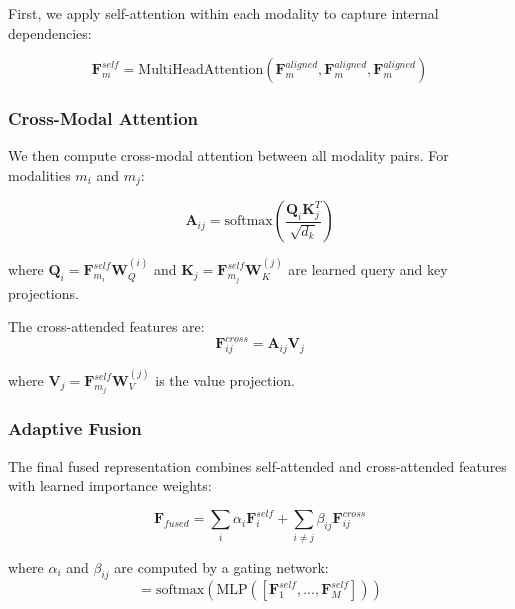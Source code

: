 \documentclass[10pt,twocolumn]{article}
\begin{document}
First, we apply self-attention within each modality to capture internal dependencies:

\begin{equation}
\mathbf{F}_m^{self} = \text{MultiHeadAttention}(\mathbf{F}_m^{aligned}, \mathbf{F}_m^{aligned}, \mathbf{F}_m^{aligned})
\end{equation}

\subsubsection{Cross-Modal Attention}

We then compute cross-modal attention between all modality pairs. For modalities $m_i$ and $m_j$:

\begin{equation}
\mathbf{A}_{ij} = \text{softmax}\left(\frac{\mathbf{Q}_i \mathbf{K}_j^T}{\sqrt{d_k}}\right)
\end{equation}

where $\mathbf{Q}_i = \mathbf{F}_{m_i}^{self} \mathbf{W}_Q^{(i)}$ and $\mathbf{K}_j = \mathbf{F}_{m_j}^{self} \mathbf{W}_K^{(j)}$ are learned query and key projections.

The cross-attended features are:
\begin{equation}
\mathbf{F}_{ij}^{cross} = \mathbf{A}_{ij} \mathbf{V}_j
\end{equation}

where $\mathbf{V}_j = \mathbf{F}_{m_j}^{self} \mathbf{W}_V^{(j)}$ is the value projection.

\subsubsection{Adaptive Fusion}

The final fused representation combines self-attended and cross-attended features with learned importance weights:

\begin{equation}
\mathbf{F}_{fused} = \sum_{i} \alpha_i \mathbf{F}_i^{self} + \sum_{i \neq j} \beta_{ij} \mathbf{F}_{ij}^{cross}
\end{equation}

where $\alpha_i$ and $\beta_{ij}$ are computed by a gating network:
\begin{equation}
[\alpha_1, ..., \alpha_M, \beta_{12}, ..., \beta_{MN}] = \text{softmax}(\text{MLP}([\mathbf{F}_1^{self}, ..., \mathbf{F}_M^{self}]))
\end{equation}
\end{document}
